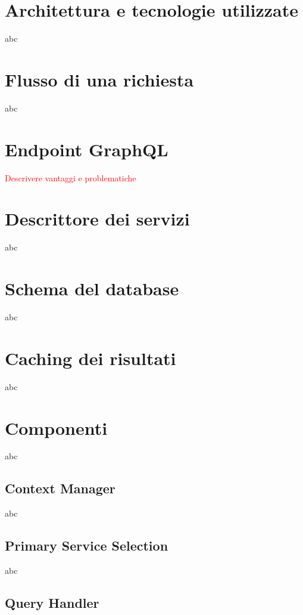 \section{Architettura e tecnologie utilizzate}

abc

\section{Flusso di una richiesta}

abc

\section{Endpoint GraphQL}

\textcolor{red}{Descrivere vantaggi e problematiche}

\section{Descrittore dei servizi}

abc

\section{Schema del database}

abc

\section{Caching dei risultati}

abc

\section{Componenti}

abc

\subsection{Context Manager}

abc

\subsection{Primary Service Selection}

abc

\subsection{Query Handler}

